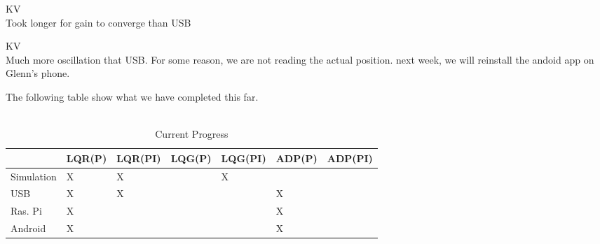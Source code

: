 \documentclass[fontsize=11pt, %
                             paper=letter, %
                             openany, %
                             captions=tableheading,
                             index=totoc,
                             hyperref]{labbook}
\begin{document}
\begin{addmargin}[0cm]{0cm}
KV\\
Took longer for gain to converge than USB

KV\\
Much more oscillation that USB.  For some reason, we are not reading the actual position.  next week, we will reinstall the andoid app on Glenn's phone.

The following table show what we have completed this far. \\
\\

\begin{table}[h!]
    \centering
    \begin{tabular}{l|l|l|l|l|l|l}
        \toprule
        \textbf{} & \textbf{LQR(P)} &
        \textbf{LQR(PI)} & \textbf{LQG(P)} &
        \textbf{LQG(PI)} & \textbf{ADP(P)} &
        \textbf{ADP(PI)}\\
        \toprule
        Simulation & X & X &   & X &   &  \\
        USB        & X & X &   &   & X &  \\
        Ras. Pi    & X &   &   &   & X &  \\
        Android    & X &   &   &   & X &  \\
        \bottomrule
    \end{tabular}
    \caption{Current Progress}
    \label{tab:progress03282019}
\end{table}


\end{addmargin}
\end{document}
